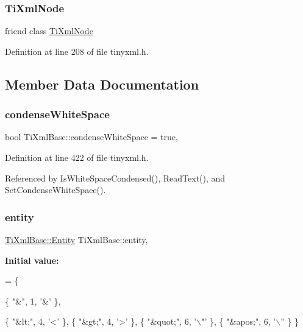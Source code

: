 \subsubsection{\texorpdfstring{Ti\+Xml\+Node}{TiXmlNode}}
{\footnotesize\ttfamily friend class \hyperlink{class_ti_xml_node}{Ti\+Xml\+Node}\hspace{0.3cm}{\ttfamily [friend]}}



Definition at line 208 of file tinyxml.\+h.



\subsection{Member Data Documentation}
\hypertarget{class_ti_xml_base_a447a05f6a3edbb7892f66f9df8244a3d}{}\label{class_ti_xml_base_a447a05f6a3edbb7892f66f9df8244a3d} 
\subsubsection{\texorpdfstring{condense\+White\+Space}{condenseWhiteSpace}}
{\footnotesize\ttfamily bool Ti\+Xml\+Base\+::condense\+White\+Space = true\hspace{0.3cm}{\ttfamily [static]}, {\ttfamily [private]}}



Definition at line 422 of file tinyxml.\+h.



Referenced by Is\+White\+Space\+Condensed(), Read\+Text(), and Set\+Condense\+White\+Space().

\hypertarget{class_ti_xml_base_aae956c75fedff20d337f7cc109c6b71a}{}\label{class_ti_xml_base_aae956c75fedff20d337f7cc109c6b71a} 
\subsubsection{\texorpdfstring{entity}{entity}}
{\footnotesize\ttfamily \hyperlink{struct_ti_xml_base_1_1_entity}{Ti\+Xml\+Base\+::\+Entity} Ti\+Xml\+Base\+::entity\hspace{0.3cm}{\ttfamily [static]}, {\ttfamily [private]}}

{\bfseries Initial value\+:}
\begin{DoxyCode}
=
  \{
    
    
    \{ \textcolor{stringliteral}{"&"},  1, \textcolor{charliteral}{'&'} \},
    

    \{ \textcolor{stringliteral}{"&lt;"},   4, \textcolor{charliteral}{'<'} \},
    \{ \textcolor{stringliteral}{"&gt;"},   4, \textcolor{charliteral}{'>'} \},
    \{ \textcolor{stringliteral}{"&quot;"}, 6, \textcolor{charliteral}{'\(\backslash\)"'} \},
    \{ \textcolor{stringliteral}{"&apos;"}, 6, \textcolor{charliteral}{'\(\backslash\)''} \}
  \}
\end{DoxyCode}


